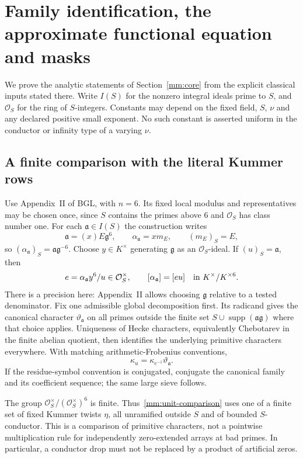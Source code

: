 \section{Family identification, the approximate functional equation and masks}
\label{mm:details}
We prove the analytic statements of Section~\ref{mm:core} from the
explicit classical inputs stated there. Write $I(S)$ for the nonzero
integral ideals prime to $S$, and $\mathcal O_S$ for the ring of
$S$-integers. Constants may depend on the fixed field, $S$, $\nu$ and
any declared positive small exponent. No such constant is asserted
uniform in the conductor or infinity type of a varying $\nu$.

\subsection{A finite comparison with the literal Kummer rows}
Use Appendix~II of BGL, with $n=6$. Its fixed local modulus and
representatives may be chosen once, since $S$ contains the primes above
$6$ and $\mathcal O_S$ has class number one. For each
$\mathfrak a\in I(S)$ the construction writes
\[
 \mathfrak a=(x)E\mathfrak g^6,\qquad
 \alpha_{\mathfrak a}=xm_E,\qquad
 (m_E)_S=E,
\]
so $(\alpha_{\mathfrak a})_S=\mathfrak a\mathfrak g^{-6}$.
Choose $y\in K^\times$ generating $\mathfrak g$ as an
$\mathcal O_S$-ideal. If $(u)_S=\mathfrak a$, then
\[
 e=\alpha_{\mathfrak a}y^6/u\in\mathcal O_S^\times,\qquad
 [\alpha_{\mathfrak a}]=[eu]\quad\hbox{in }K^\times/K^{\times6}.
\]
There is a precision here: Appendix~II allows choosing $\mathfrak g$
relative to a tested denominator. Fix one admissible global decomposition
first. Its radicand gives the canonical character
$\vartheta_{\mathfrak a}$ on all primes outside the finite set
$S\cup\operatorname{supp}(\mathfrak a\mathfrak g)$ where that
choice applies. Uniqueness of Hecke characters, equivalently Chebotarev
in the finite abelian quotient, then identifies the underlying primitive
characters everywhere. With matching arithmetic-Frobenius conventions,
\begin{equation}\label{mm:unit-comparison}
 \kappa_u=\kappa_{e^{-1}}\vartheta_{\mathfrak a}.
\end{equation}
If the residue-symbol convention is conjugated, conjugate the canonical
family and its coefficient sequence; the same large sieve follows.

The group $\mathcal O_S^\times/(\mathcal O_S^\times)^6$ is finite.
Thus~\eqref{mm:unit-comparison} uses one of a finite set of fixed
Kummer twists $\eta$, all unramified outside $S$ and of bounded
$S$-conductor. This is a comparison of primitive characters, not a
pointwise multiplication rule for independently zero-extended arrays at
bad primes. In particular, a conductor drop must not be replaced by a
product of artificial zeros.

